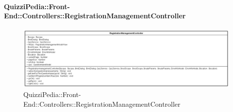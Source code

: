 \paragraph[QuizziPedia::Front-End::Controllers\\::RegistrationManagementController]{QuizziPedia::Front-End::Controllers::RegistrationManagementController}
\begin{figure} [ht]
	\centering
	\includegraphics[scale=0.6]{UML/Classi/Front-End/QuizziPedia_Front-end_Controller_RegistrationManagementController.png}
	\caption{QuizziPedia::Front-End::Controllers::RegistrationManagementController}
\end{figure} \FloatBarrier

